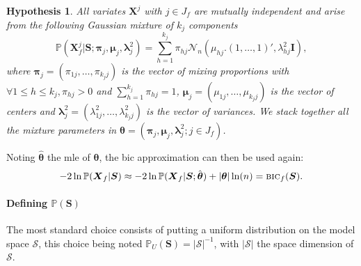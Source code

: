 \documentclass[11pt,a4paper]{article}
\newtheorem{hyp}{Hypothesis}
\begin{document}
\begin{hyp}\label{H4}
All variates $\boldsymbol{X}^j$ with $j \in J_f$ are mutually independent and arise from the following Gaussian mixture of $k_j$ components
\begin{equation}
\mathbb{P}(\boldsymbol{X}_f^j|\boldsymbol{S};\boldsymbol{\pi}_{j},\boldsymbol{\mu}_j,\boldsymbol{\lambda}^2_j) = \sum_{h=1}^{k_j} \pi_{hj} \mathcal{N}_n(\mu_{hj} . (1,\ldots,1)',\lambda_{hj}^2\boldsymbol{I}),
\end{equation}
where $\boldsymbol{\pi}_{j}=(\pi_{1j},\ldots,\pi_{k_jj})$ is the vector of mixing proportions with $\forall 1\leq h\leq k_j , \pi_{hj}>0$ and $\sum_{h=1}^{k_j}\pi_{hj}=1$, $\boldsymbol{\mu}_j=(\mu_{1j},\ldots,\mu_{k_jj})$  is the vector of centers and $\boldsymbol{\lambda}^2_j=(\lambda^2_{1j},\ldots,\lambda^2_{k_jj})$ is the vector of variances. We stack together all the mixture parameters in $\boldsymbol{\theta}=(\boldsymbol{\pi}_{j},\boldsymbol{\mu}_j,\boldsymbol{\lambda}^2_j ; j \in J_f)$.
\end{hyp}

\vspace{3mm}

Noting $\hat{\boldsymbol{\theta}}$ the {\sc mle} of $\boldsymbol{\theta}$, the {\sc bic} approximation can then be used again:
\begin{equation}
-2\ln \mathbb{P}(\boldsymbol{X}_f|\boldsymbol{S}) \approx -2\ln \mathbb{P}(\boldsymbol{X}_f|\boldsymbol{S};\hat{\boldsymbol{\theta}}) + |{\boldsymbol{\theta}}| \ln(n) = \mbox{{\sc bic}}_f(\boldsymbol{S}).
\end{equation}

\paragraph{Defining $\mathbb{P}(\boldsymbol{S})$} The most standard choice consists of putting a uniform distribution on the model space $\mathcal{S}$, this choice being noted $\mathbb{P}_U(\boldsymbol{S}) = |\mathcal{S}|^{-1}$, with $|\mathcal{S}|$ the space dimension of $\mathcal{S}$.
\end{document}
